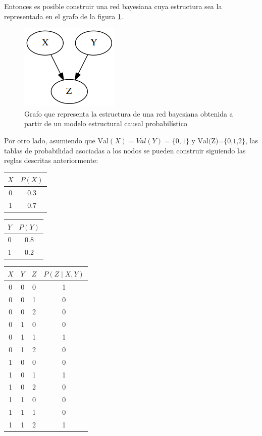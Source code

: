 Entonces es posible construir una red bayesiana cuya estructura sea la representada en el grafo de la figura \ref{fig:scm-to-bn}.

\begin{figure}[h!]
	\centering
	\includegraphics[width=0.3\linewidth]{./images/Chapter 2/scm-to-bn.png}		
	\caption{Grafo que representa la estructura de una red bayesiana obtenida a partir de un modelo estructural causal probabilístico}
	\label{fig:scm-to-bn}
\end{figure}

Por otro lado, asumiendo que $\text{Val}(X)={Val}(Y)=\{0,1\}$ y $\text{Val(Z)=\{0,1,2\}}$, las tablas de probabilidad asociadas a los nodos se pueden construir siguiendo las reglas descritas anteriormente:
\begin{center}
	\begin{tabular}{|c|c|}
		\hline 
		$X$ & $P(X)$ \\ 
		\hline 
		0 & 0.3 \\ 
		\hline 
		1 & 0.7 \\ 
		\hline 
	\end{tabular}
	\quad
	\begin{tabular}{|c|c|}
		\hline 
		$Y$ & $P(Y)$ \\ 
		\hline 
		0 & 0.8 \\ 
		\hline 
		1 & 0.2 \\ 
		\hline 
	\end{tabular}
	\quad
	\begin{tabular}{|c|c|c|c|}
		\hline 
		$X$ & $Y$ & $Z$ & $P(Z \mid X,Y)$ \\ 
		\hline 
		0 & 0 & 0 & 1 \\ 
		\hline 
		0 & 0 & 1 & 0 \\ 
		\hline 
		0 & 0 & 2 & 0 \\ 
		\hline 
		0 & 1 & 0 & 0 \\ 
		\hline 
		0 & 1 & 1 & 1 \\ 
		\hline 
		0 & 1 & 2 & 0 \\ 
		\hline 
		1 & 0 & 0 & 0 \\ 
		\hline 
		1 & 0 & 1 & 1 \\ 
		\hline 
		1 & 0 & 2 & 0 \\ 
		\hline 
		1 & 1 & 0 & 0 \\ 
		\hline 
		1 & 1 & 1 & 0 \\ 
		\hline 
		1 & 1 & 2 & 1 \\ 
		\hline 
	\end{tabular}
\end{center}
